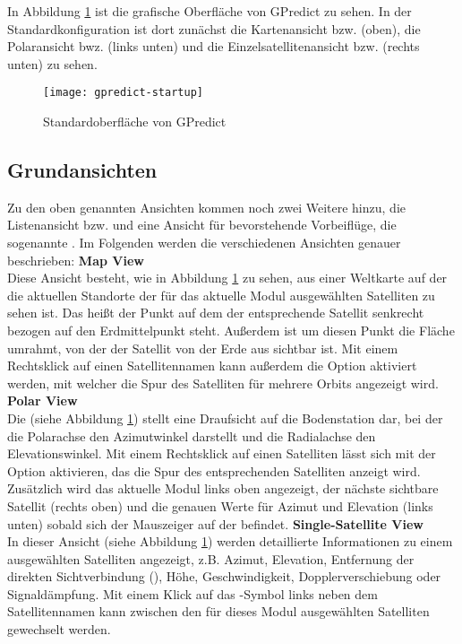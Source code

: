 In Abbildung \ref{fig:gpredictstartup} ist die grafische Oberfläche von GPredict zu sehen. In der Standardkonfiguration ist dort zunächst die Kartenansicht bzw.  (oben), die Polaransicht bwz.  (links unten) und die Einzelsatellitenansicht bzw.  (rechts unten) zu sehen.

\begin{figure}[h]
	\centering
	\texttt{[image: gpredict-startup]}
	\caption{Standardoberfläche von GPredict}
	\label{fig:gpredictstartup} 
\end{figure}

\clearpage

\subsection{Grundansichten}

Zu den oben genannten Ansichten kommen noch zwei Weitere hinzu, die Listenansicht bzw.  und eine Ansicht für bevorstehende Vorbeiflüge, die sogenannte . Im Folgenden werden die verschiedenen Ansichten genauer beschrieben:\newpar
\textbf{Map View}\\
Diese Ansicht besteht, wie in Abbildung \ref{fig:gpredictstartup} zu sehen, aus einer Weltkarte auf der die aktuellen Standorte der für das aktuelle Modul ausgewählten Satelliten zu sehen ist. Das heißt der Punkt auf dem der entsprechende Satellit senkrecht bezogen auf den Erdmittelpunkt steht. Außerdem ist um diesen Punkt die Fläche umrahmt, von der der Satellit von der Erde aus sichtbar ist. Mit einem Rechtsklick auf einen Satellitennamen kann außerdem die Option  aktiviert werden, mit welcher die Spur des Satelliten für mehrere Orbits angezeigt wird.\newpar
\textbf{Polar View}\\
Die  (siehe Abbildung \ref{fig:gpredictstartup}) stellt eine Draufsicht auf die Bodenstation dar, bei der die Polarachse den Azimutwinkel darstellt und die Radialachse den Elevationswinkel. Mit einem Rechtsklick auf einen Satelliten lässt sich mit der Option  aktivieren, das die Spur des entsprechenden Satelliten anzeigt wird. Zusätzlich wird das aktuelle Modul links oben angezeigt, der nächste sichtbare Satellit (rechts oben) und die genauen Werte für Azimut und Elevation (links unten) sobald sich der Mauszeiger auf der  befindet.\newpar
\textbf{Single-Satellite View}\\
In dieser Ansicht (siehe Abbildung \ref{fig:gpredictstartup}) werden detaillierte Informationen zu einem ausgewählten Satelliten angezeigt, z.B. Azimut, Elevation, Entfernung der direkten Sichtverbindung (), Höhe, Geschwindigkeit, Dopplerverschiebung oder Signaldämpfung. Mit einem Klick auf das \myvsymbol-Symbol links neben dem Satellitennamen kann zwischen den für dieses Modul ausgewählten Satelliten gewechselt werden.

